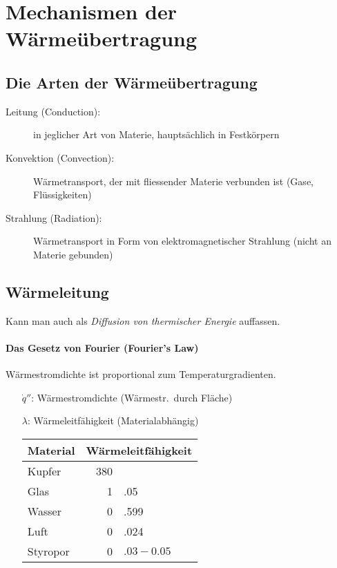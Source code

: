 
\section{Mechanismen der Wärmeübertragung} %
	\subsection{Die Arten der Wärmeübertragung} %
		\begin{description}
			\item[Leitung (Conduction):] in jeglicher Art von Materie, hauptsächlich in Festkörpern
			\item[Konvektion (Convection):] Wärmetransport, der mit fliessender Materie verbunden ist (Gase, Flüssigkeiten)
			\item[Strahlung (Radiation):] Wärmetransport in Form von elektromagnetischer Strahlung (nicht an Materie gebunden)
		\end{description}

	\subsection{Wärmeleitung} %
		Kann man auch als \emph{Diffusion von thermischer Energie} auffassen.

		\paragraph{Das Gesetz von Fourier (Fourier's Law)} %
			Wärmestromdichte ist proportional zum Temperaturgradienten.
			\begin{itemize}
				\item[$\dot q''$:] Wärmestromdichte (Wärmestr.~durch Fläche) \niceunit{\watt\per\metre\squared}
				\item[$\lambda$:] Wärmeleitfähigkeit (Materialabhängig) \niceunit{\watt\per\metre\per\kelvin}
					\begin{center}
						\begin{tabular}{l|r@{}l}
							\textbf{Material} & \multicolumn{2}{l}{\textbf{Wärmeleitfähigkeit} \niceunit{\watt\per\metre\per\kelvin}} \\
							\midrule
							Kupfer & 380 & \\
							Glas & 1&.05 \\
							Wasser & 0&.599 \\
							Luft & 0&.024 \\
							Styropor & 0&$.03 - 0.05$
						\end{tabular}
					\end{center}
			\end{itemize}

